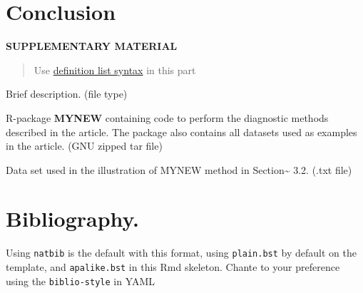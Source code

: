 \documentclass[12pt]{article}
\providecommand{\tightlist}{%
  \setlength{\itemsep}{0pt}\setlength{\parskip}{0pt}}
\begin{document}
\section{Conclusion}\label{conc}

\bigskip

\begin{center}
\textbf{SUPPLEMENTARY MATERIAL}

\end{center}

\begin{quote}
Use \href{https://pandoc.org/MANUAL.html\#definition-lists}{definition
list syntax} in this part
\end{quote}

\begin{description}
\tightlist
\item[Title:]
Brief description. (file type)
\item[R-package for MYNEW routine:]
R-package \textbf{MYNEW} containing code to perform the diagnostic
methods described in the article. The package also contains all datasets
used as examples in the article. (GNU zipped tar file)
\item[HIV data set:]
Data set used in the illustration of MYNEW method in
Section\textasciitilde{} 3.2. (.txt file)
\end{description}

\section{Bibliography.}\label{bibliography.}

Using \texttt{natbib} is the default with this format, using
\texttt{plain.bst} by default on the template, and \texttt{apalike.bst}
in this Rmd skeleton. Chante to your preference using the
\texttt{biblio-style} in YAML



\end{document}
